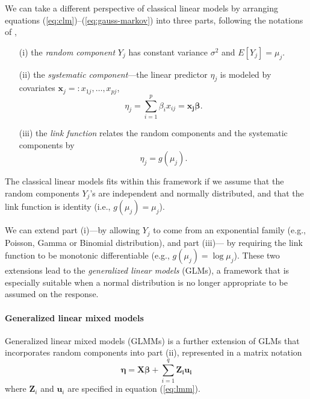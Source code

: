 We can take a different perspective of classical linear models by arranging equations
(\ref{eq:clm})--(\ref{eq:gauss-markov}) into three parts, following the notations of \citet[Chapter
2]{mccullagh1989generalized}, 
\begin{enumerate}
	\item[(i)] the \textit{random component} $Y_j$ has constant variance $\sigma^2$ and
	$E[ Y_j]= \mu_j$.
	\item[(ii)] the \textit{systematic component}---the linear predictor $\eta_j$ is modeled by
	covariates $\bm x_j =: x_{1j},\ldots, x_{pj}$, 
	\begin{equation}\label{eq:part2}
		\eta_j = \sum_{i=1}^p\beta_i x_{ij}=\bm {x_j\beta}.
	\end{equation}
	\item[(iii)] the \textit{link function} relates the random components and the systematic
	components by 
	\begin{equation}\label{eq:part3}
		\eta_j = g(\mu_j).
	\end{equation}
\end{enumerate}
The classical linear models fits within this framework if we assume that the random components 
$Y_j$'s
are independent and normally distributed, and that the link function is identity (i.e., $g(\mu_j)=
\mu_j$).

We can extend part (i)---by allowing $Y_j$ to come from an exponential family (e.g., Poisson,
Gamma or Binomial distribution), and part (iii)--- by requiring the link function to be monotonic
differentiable (e.g., $g(\mu_j)= \log \mu_j$). These two extensions lead to the
\textit{generalized linear models} (GLMs), a framework that is especially suitable when a normal 
distribution is no longer appropriate to be assumed on the response. 

\paragraph{Generalized linear mixed models}\label{para:glmm}
Generalized linear mixed models (GLMMs) is a further extension of GLMs that incorporates random
components into part (ii), represented in a matrix notation
\begin{equation}\label{eq:q5}
	\bm \eta = \bm {X\beta} + \sum_{i=1}^q\bm {Z_iu_i}
\end{equation}
where  $\bm Z_i$ and $\bm u_i$ are specified in equation (\ref{eq:lmm}). 

